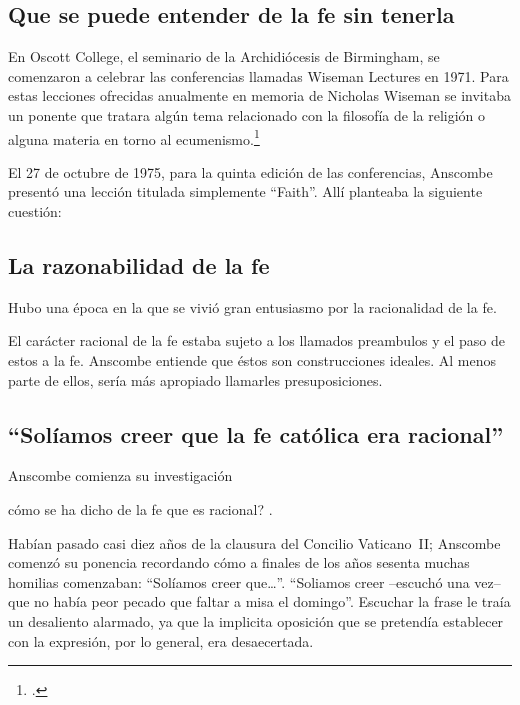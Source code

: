 \subsection{Que se puede entender de la fe sin tenerla}
En Oscott College, el seminario de la Archidiócesis de Birmingham, se comenzaron
a celebrar las conferencias llamadas Wiseman Lectures en 1971. Para estas
lecciones ofrecidas anualmente en memoria de Nicholas Wiseman se invitaba un
ponente que tratara algún tema relacionado con la filosofía de la religión o
alguna materia en torno al ecumenismo.\footcite[cf.~][p.~7]{wisemanlects}

El 27 de octubre de 1975, para la quinta edición de las conferencias, Anscombe
presentó una lección titulada simplemente ``Faith''. Allí planteaba la
siguiente cuestión: 

\subsection{La razonabilidad de la fe}
Hubo una época en la que se vivió gran entusiasmo por la racionalidad de la
fe.

El carácter racional de la fe estaba sujeto a los llamados preambulos y el
paso de estos a la fe. Anscombe entiende que éstos son construcciones ideales.
Al menos parte de ellos, sería más apropiado llamarles
presuposiciones.

\subsection{``Solíamos creer que la fe católica era racional''}
Anscombe comienza su investigación

cómo se ha dicho de la fe que es racional?
.



Habían pasado casi diez años de la clausura del Concilio Vaticano~II; Anscombe
comenzó su ponencia recordando cómo a finales de los años sesenta muchas
homilias comenzaban: ``Solíamos creer que\ldots''. ``Soliamos creer --escuchó
una vez-- que no había peor pecado que faltar a misa el domingo''. Escuchar la
frase le traía un desaliento alarmado, ya que la implicita oposición que se
pretendía establecer con la expresión, por lo general, era desaecertada.

